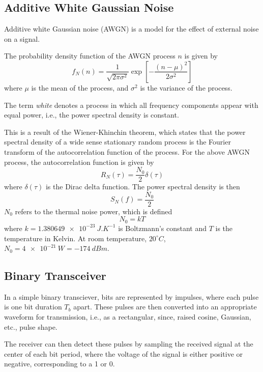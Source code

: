 \documentclass{article}
\begin{document}
\subsection{Additive White Gaussian Noise}
Additive white Gaussian noise (AWGN) is a model for the effect of
external noise on a signal.

The probability density function of the AWGN process \(n\) is given by
\begin{equation*}
    f_N\left( n \right) = \frac{1}{\sqrt{2\pi \sigma^2}} \exp{\left[ -\frac{\left( n - \mu \right)^2}{2\sigma^2} \right]}
\end{equation*}
where \(\mu\) is the mean of the process, and \(\sigma^2\) is the
variance of the process.

The term \textit{white} denotes a process in which all frequency
components appear with equal power, i.e., the power spectral density is
constant.

This is a result of the Wiener-Khinchin theorem, which states that the
power spectral density of a wide sense stationary random process is the
Fourier transform of the autocorrelation function of the process. For
the above AWGN process, the autocorrelation function is given by
\begin{equation*}
    R_N\left( \tau \right) = \frac{N_0}{2} \delta\left( \tau \right)
\end{equation*}
where \(\delta\left( \tau \right)\) is the Dirac delta function. The
power spectral density is then
\begin{equation*}
    S_N\left( f \right) = \frac{N_0}{2}
\end{equation*}
\(N_0\) refers to the thermal noise power, which is defined
\begin{equation*}
    N_0 = k T
\end{equation*}
where \(k = \qty{1.380649e-23}{J.K^{-1}}\) is Boltzmann's constant and
\(T\) is the temperature in Kelvin. At room temperature,
\(20^{\circ}C\), \(N_0 = \qty{4e-21}{W} = \qty{-174}{dBm}\).
\subsection{Binary Transceiver}
In a simple binary transciever, bits are represented by impulses, where
each pulse is one bit duration \(T_b\) apart. These pulses are then
converted into an appropriate waveform for transmission, i.e., as a
rectangular, since, raised cosine, Gaussian, etc., pulse shape.

The receiver can then detect these pulses by sampling the received
signal at the center of each bit period, where the voltage of the
signal is either positive or negative, corresponding to a 1 or 0.
\end{document}
